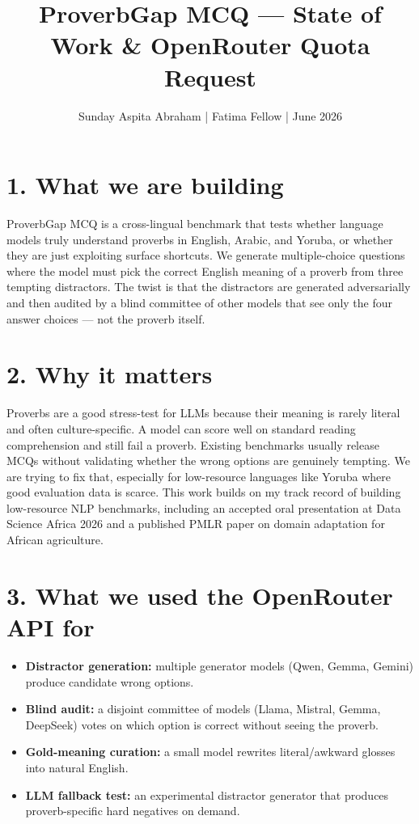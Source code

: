 \documentclass[10pt]{article}
\title{\vspace{-1.2cm}\textbf{ProverbGap MCQ --- State of Work \& OpenRouter Quota Request}}
\author{Sunday Aspita Abraham \quad | \quad 2026 Fatima Fellow \quad | \quad 22 June 2026}
\date{}
\begin{document}
\maketitle
\vspace{-0.6cm}

\section*{1. What we are building}
ProverbGap MCQ is a cross-lingual benchmark that tests whether language models truly understand proverbs in English, Arabic, and Yoruba, or whether they are just exploiting surface shortcuts. We generate multiple-choice questions where the model must pick the correct English meaning of a proverb from three tempting distractors. The twist is that the distractors are generated adversarially and then audited by a blind committee of other models that see only the four answer choices --- not the proverb itself.

\section*{2. Why it matters}
Proverbs are a good stress-test for LLMs because their meaning is rarely literal and often culture-specific. A model can score well on standard reading comprehension and still fail a proverb. Existing benchmarks usually release MCQs without validating whether the wrong options are genuinely tempting. We are trying to fix that, especially for low-resource languages like Yoruba where good evaluation data is scarce. This work builds on my track record of building low-resource NLP benchmarks, including an accepted oral presentation at Data Science Africa 2026 and a published PMLR paper on domain adaptation for African agriculture.

\section*{3. What we used the OpenRouter API for}
\begin{itemize}[leftmargin=0.5cm, itemsep=1pt]
    \item \textbf{Distractor generation:} multiple generator models (Qwen, Gemma, Gemini) produce candidate wrong options.
    \item \textbf{Blind audit:} a disjoint committee of models (Llama, Mistral, Gemma, DeepSeek) votes on which option is correct without seeing the proverb.
    \item \textbf{Gold-meaning curation:} a small model rewrites literal/awkward glosses into natural English.
    \item \textbf{LLM fallback test:} an experimental distractor generator that produces proverb-specific hard negatives on demand.
\end{itemize}
\end{document}
